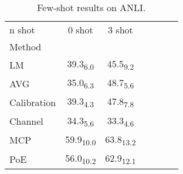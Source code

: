 \begin{table}[h]
\centering
\caption{Few-shot results on ANLI.}
\label{tab:few_shot}
\begin{tabular}{lcccccc}
n shot & 0 shot & 3 shot \\
Method &  &  \\
LM & 39.3\textsubscript{6.0} & 45.5\textsubscript{9.2} \\
AVG & 35.0\textsubscript{6.3} & 48.7\textsubscript{5.6} \\
Calibration & 39.3\textsubscript{4.3} & 47.8\textsubscript{7.8} \\
Channel & 34.3\textsubscript{5.6} & 33.3\textsubscript{4.6} \\
MCP & 59.9\textsubscript{10.0} & 63.8\textsubscript{13.2} \\
PoE & 56.0\textsubscript{10.2} & 62.9\textsubscript{12.1} \\
\end{tabular}
\end{table}
